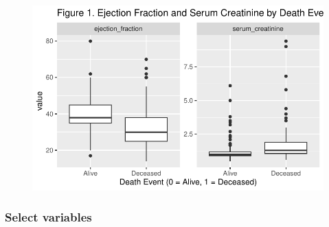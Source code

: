 \documentclass[
  letterpaper,
  DIV=11,
  numbers=noendperiod]{scrartcl}
\begin{document}
\begin{figure}[H]

{\centering \includegraphics{SDS-291-final-project-report_files/figure-pdf/unnamed-chunk-7-1.pdf}

}

\end{figure}

\hypertarget{select-variables}{%
\subsubsection{Select variables}\label{select-variables}}
\end{document}
